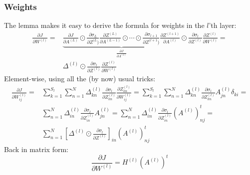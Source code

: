 \documentclass[12pt, a4paper]{article}
\numberwithin{equation}{section}
\begin{document}
\subsubsection{Weights}
The lemma makes it easy to derive the formula for weights in the $l$'th layer:
\begin{align}
\frac{\partial J}{\partial W^{(l)}}=&\underbrace{\frac{\partial J}{\partial A^{(L)}}\odot\frac{\partial\sigma_L}{\partial Z^{(L})}\frac{\partial Z^{(L)}}{\partial A^{(L-1)}}\odot\cdots\odot\frac{\partial\sigma_{l+1}}{\partial Z^{(l+1})}\frac{\partial Z^{(l+1)}}{\partial A^{(l)}}}_{\frac{\partial J}{\partial A^{(l)}}}\odot\frac{\partial\sigma_l}{\partial Z^{(l)}}\frac{\partial Z^{(l)}}{\partial W^{(l)}}=\\
&\Delta^{(l)}\odot\frac{\partial\sigma_l}{\partial Z^{(l)}}\frac{\partial Z^{(l)}}{\partial W^{(l)}}
\end{align}
Element-wise, using all the (by now) usual tricks:
\begin{align}
\frac{\partial J}{\partial W^{(l)}_{ij}}=&\sum_{k=1}^{S_l}\sum_{n=1}^N\Delta^{(l)}_{kn}\frac{\partial\sigma_l}{\partial Z^{(l)}_{kn}}\frac{\partial Z^{(l)}_{kn}}{\partial W^{(l)}_{ij}}=\sum_{k=1}^{S_l}\sum_{n=1}^N\Delta^{(l)}_{kn}\frac{\partial\sigma_l}{\partial Z^{(l)}_{kn}}A^{(l)}_{jn}\delta_{ki}=\\
&\sum_{n=1}^N\Delta^{(l)}_{in}\frac{\partial\sigma_l}{\partial Z^{(l)}_{in}}A^{(l)}_{jn}=\sum_{n=1}^N\Delta^{(l)}_{in}\frac{\partial\sigma_l}{\partial Z^{(l)}_{in}}\left(A^{(l)}\right)^t_{nj}=\\
&\sum_{n=1}^N\left[\Delta^{(l)}\odot\frac{\partial\sigma_l}{\partial Z^{(l)}}\right]_{in}\left(A^{(l)}\right)^t_{nj}
\end{align}
Back in matrix form:
\begin{equation}
\frac{\partial J}{\partial W^{(l)}}=H^{(l)}\left(A^{(l)}\right)^t
\end{equation}
\end{document}
